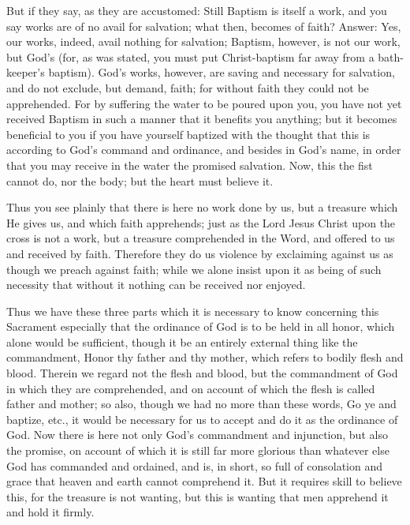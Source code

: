 But if they say, as they are accustomed: Still Baptism is itself a
work, and you say works are of no avail for salvation; what then,
becomes of faith? Answer: Yes, our works, indeed, avail nothing for
salvation; Baptism, however, is not our work, but God's (for, as was
stated, you must put Christ-baptism far away from a bath-keeper's
baptism). God's works, however, are saving and necessary for salvation,
and do not exclude, but demand, faith; for without faith they could not
be apprehended. For by suffering the water to be poured upon you, you
have not yet received Baptism in such a manner that it benefits you
anything; but it becomes beneficial to you if you have yourself
baptized with the thought that this is according to God's command and
ordinance, and besides in God's name, in order that you may receive in
the water the promised salvation. Now, this the fist cannot do, nor the
body; but the heart must believe it.

Thus you see plainly that there is here no work done by us, but a
treasure which He gives us, and which faith apprehends; just as the
Lord Jesus Christ upon the cross is not a work, but a treasure
comprehended in the Word, and offered to us and received by faith.
Therefore they do us violence by exclaiming against us as though we
preach against faith; while we alone insist upon it as being of such
necessity that without it nothing can be received nor enjoyed.

Thus we have these three parts which it is necessary to know
concerning this Sacrament especially that the ordinance of God is to be
held in all honor, which alone would be sufficient, though it be an
entirely external thing like the commandment, Honor thy father and thy
mother, which refers to bodily flesh and blood. Therein we regard not
the flesh and blood, but the commandment of God in which they are
comprehended, and on account of which the flesh is called father and
mother; so also, though we had no more than these words, Go ye and
baptize, etc., it would be necessary for us to accept and do it as the
ordinance of God. Now there is here not only God's commandment and
injunction, but also the promise, on account of which it is still far
more glorious than whatever else God has commanded and ordained, and
is, in short, so full of consolation and grace that heaven and earth
cannot comprehend it. But it requires skill to believe this, for the
treasure is not wanting, but this is wanting that men apprehend it and
hold it firmly.

